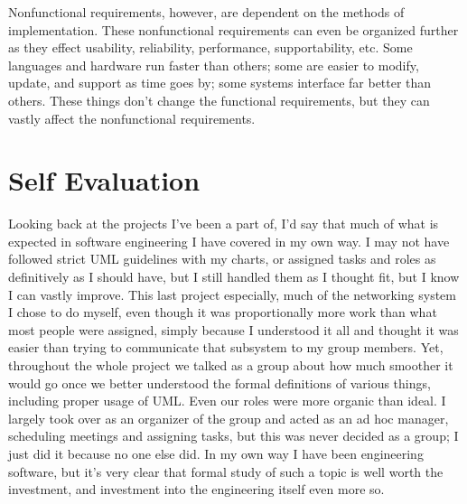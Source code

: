 \documentclass[prb,preprint]{revtex4-2}
\begin{document}
Nonfunctional requirements, however, are dependent on the methods of implementation. These nonfunctional requirements can even be organized further as they effect usability, reliability, performance, supportability, etc. Some languages and hardware run faster than others; some are easier to modify, update, and support as time goes by; some systems interface far better than others. These things don't change the functional requirements, but they can vastly affect the nonfunctional requirements. 

\section*{Self Evaluation}
Looking back at the projects I've been a part of, I'd say that much of what is expected in software engineering I have covered in my own way. I may not have followed strict UML guidelines with my charts, or assigned tasks and roles as definitively as I should have, but I still handled them as I thought fit, but I know I can vastly improve. This last project especially, much of the networking system I chose to do myself, even though it was proportionally more work than what most people were assigned, simply because I understood it all and thought it was easier than trying to communicate that subsystem to my group members. Yet, throughout the whole project we talked as a group about how much smoother it would go once we better understood the formal definitions of various things, including proper usage of UML. Even our roles were more organic than ideal. I largely took over as an organizer of the group and acted as an ad hoc manager, scheduling meetings and assigning tasks, but this was never decided as a group; I just did it because no one else did. In my own way I have been engineering software, but it's very clear that formal study of such a topic is well worth the investment, and investment into the engineering itself even more so.
\end{document}
